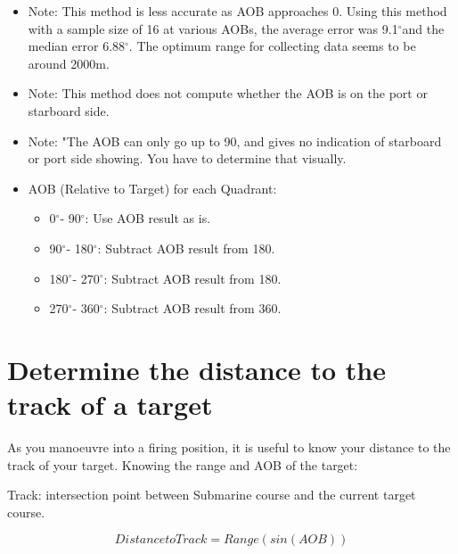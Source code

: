 \documentclass{article}
\newcommand{\degree}{$^{\circ}$}
\begin{document}
\begin{itemize}
\item{Note: This method is less accurate as AOB approaches 0. Using this method with a sample size of 16 at various AOBs, the average error was 9.1\degree and the median error 6.88\degree. The optimum range for collecting data seems to be around 2000m.}
\item{Note: This method does not compute whether the AOB is on the port or starboard side.}
\item{Note: "The AOB can only go up to 90, and gives no indication of starboard or port side showing. You have to determine that visually.}

\item{
AOB (Relative to Target) for each Quadrant:
	\begin{itemize}
	\item{0\degree - 90\degree : Use AOB result as is.}
	\item{90\degree - 180\degree : Subtract AOB result from 180.}
	\item{180\degree - 270\degree : Subtract AOB result from 180.}
	\item{270\degree - 360\degree : Subtract AOB result from 360.}
	\end{itemize}

}
\end{itemize}

\section{Determine the distance to the track of a target}

As you manoeuvre into a firing position, it is useful to know your distance to the track of your target. Knowing the range and AOB of the target:

Track: intersection point between Submarine course and the current target course.

$$Distance to Track = Range \left( sin(AOB) \right)$$
%
%
%
\end{document}
